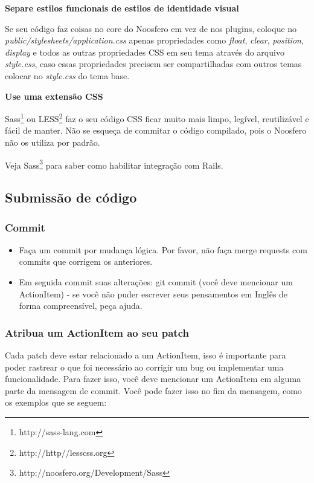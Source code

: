 \documentclass[11pt]{article}
\begin{document}
{\bf Separe estilos funcionais de estilos de identidade visual}

Se seu código faz coisas no core do Noosfero em vez de nos plugins, coloque no
{\it public/stylesheets/application.css} apenas propriedades como {\it float},
{\it clear}, {\it position}, {\it display} e todos as outras propriedades CSS em
seu tema através do arquivo {\it style.css}, caso essas propriedades precisem
ser compartilhadas com outros temas colocar no {\it style.css} do tema base.

{\bf Use uma extensão CSS}

Sass\footnote{http://sass-lang.com} ou LESS\footnote{http://http//lesscss.org}
faz o seu código CSS ficar muito mais limpo, legível, reutilizável e fácil de
manter. Não se esqueça de commitar o código compilado, pois o Noosfero não os
utiliza por padrão.

Veja Sass\footnote{http://noosfero.org/Development/Sass} para saber como
habilitar integração com Rails.

\subsection{Submissão de código}

\subsubsection{Commit}

\begin{itemize}
  \item Faça um commit por mudança lógica. Por favor, não faça merge requests
    com commits que corrigem os anteriores.
  \item Em seguida commit suas alterações: git commit (você deve mencionar um
    ActionItem) - se você não puder escrever seus pensamentos em
    Inglês de forma compreensível, peça ajuda.
\end{itemize}

\subsubsection{Atribua um ActionItem ao seu patch}

Cada patch deve estar relacionado a um ActionItem, isso é importante para
poder rastrear o que foi necessário ao corrigir um bug ou implementar uma
funcionalidade. Para fazer isso, você deve mencionar um ActionItem em alguma
parte da mensagem de commit. Você pode fazer isso no fim da mensagem, como os
exemplos que se seguem:
\end{document}
